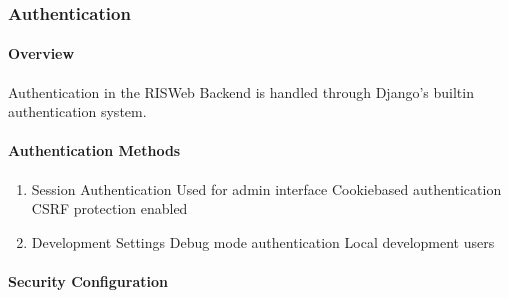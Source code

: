 \documentclass[letterpaper,10pt,english]{sphinxmanual}
\begin{document}
\subsubsection{Authentication}
\label{\detokenize{api/authentication:authentication}}\label{\detokenize{api/authentication::doc}}

\paragraph{Overview}
\label{\detokenize{api/authentication:overview}}
\sphinxAtStartPar
Authentication in the RIS\sphinxhyphen{}Web Backend is handled through Django’s built\sphinxhyphen{}in authentication system.


\paragraph{Authentication Methods}
\label{\detokenize{api/authentication:authentication-methods}}\begin{enumerate}
%
\item {} 
\sphinxAtStartPar
Session Authentication
\sphinxhyphen{} Used for admin interface
\sphinxhyphen{} Cookie\sphinxhyphen{}based authentication
\sphinxhyphen{} CSRF protection enabled

\item {} 
\sphinxAtStartPar
Development Settings
\sphinxhyphen{} Debug mode authentication
\sphinxhyphen{} Local development users

\end{enumerate}


\paragraph{Security Configuration}
\label{\detokenize{api/authentication:security-configuration}}
\begin{sphinxVerbatim}[commandchars=\\\{\}]
  \PYG{p}{[}
\PYG{p}{]}

  
  
\end{sphinxVerbatim}
\end{document}
